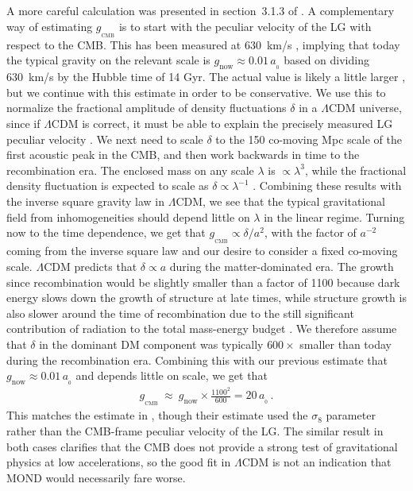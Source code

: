 \documentclass[fleqn,usenatbib,useAMS]{mnras} %
\begin{document}
A more careful calculation was presented in section~3.1.3 of \citet{Haslbauer_2020}. A complementary way of estimating $g_{_{\text{CMB}}}$ is to start with the peculiar velocity of the LG with respect to the CMB. This has been measured at 630~km/s \citep{Kogut_1993}, implying that today the typical gravity on the relevant scale is $g_{\text{now}} \approx 0.01 \, a_{_0}$ based on dividing 630~km/s by the Hubble time of 14 Gyr. The actual value is likely a little larger \citep[see section~2.2 of][]{Banik_Ryan_2018}, but we continue with this estimate in order to be conservative. We use this to normalize the fractional amplitude of density fluctuations $\delta$ in a $\Lambda$CDM universe, since if $\Lambda$CDM is correct, it must be able to explain the precisely measured LG peculiar velocity \citep[this assumption was verified in e.g.][]{Candlish_2016}. We next need to scale $\delta$ to the 150 co-moving Mpc scale of the first acoustic peak in the CMB, and then work backwards in time to the recombination era. The enclosed mass on any scale $\lambda$ is $\propto \lambda^3$, while the fractional density fluctuation is expected to scale as $\delta \propto \lambda^{-1}$ \citep{Harrison_1970, Zeldovich_1972}. Combining these results with the inverse square gravity law in $\Lambda$CDM, we see that the typical gravitational field from inhomogeneities should depend little on $\lambda$ in the linear regime. Turning now to the time dependence, we get that $g_{_{\text{CMB}}} \propto \delta/a^2$, with the factor of $a^{-2}$ coming from the inverse square law and our desire to consider a fixed co-moving scale. $\Lambda$CDM predicts that $\delta \propto a$ during the matter-dominated era. The growth since recombination would be slightly smaller than a factor of 1100 because dark energy slows down the growth of structure at late times, while structure growth is also slower around the time of recombination due to the still significant contribution of radiation to the total mass-energy budget \citep[the Meszaros effect;][]{Meszaros_1974}. We therefore assume that $\delta$ in the dominant DM component was typically $600\times$ smaller than today during the recombination era. Combining this with our previous estimate that $g_{\text{now}} \approx 0.01 \, a_{_0}$ and depends little on scale, we get that
\begin{eqnarray}
    g_{_{\text{CMB}}} ~\approx~ g_{\text{now}} \times \frac{1100^2}{600} = 20 \, a_{_0} \, .
\end{eqnarray}
This matches the estimate in \citet{Haslbauer_2020}, though their estimate used the $\sigma_8$ parameter rather than the CMB-frame peculiar velocity of the LG. The similar result in both cases clarifies that the CMB does not provide a strong test of gravitational physics at low accelerations, so the good fit in $\Lambda$CDM is not an indication that MOND would necessarily fare worse.
\end{document}
